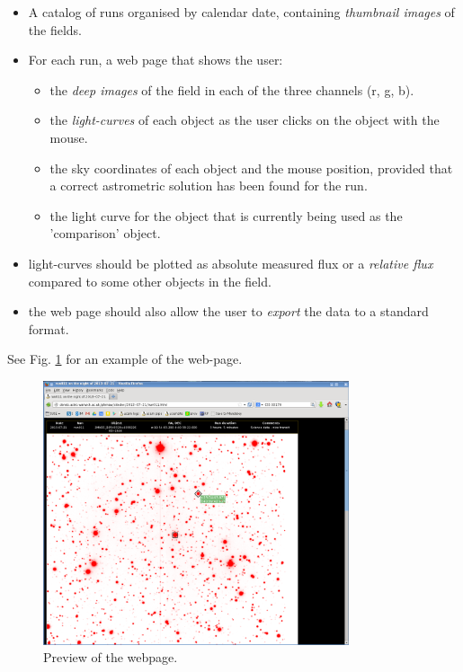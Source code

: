 \begin{itemize}
	\item A catalog of runs organised by calendar date, containing \emph{thumbnail images} of the fields.
	\item For each run, a web page that shows the user:
	\begin{itemize}
		\item the \emph{deep images} of the field in each of the three channels (r, g, b).
		\item the \emph{light-curves} of each object as the user clicks on the object with the mouse. 
		\item the sky coordinates of each object and the mouse position, provided that a correct astrometric solution has been found for the run. 
		\item the light curve for the object that is currently being used as the 'comparison' object. 
	\end{itemize}
	\item light-curves should be plotted as absolute measured flux or a \emph{relative flux} compared to some other objects in the field. 
	\item the web page should also allow the user to \emph{export} the data to a standard format.
	
\end{itemize}
See Fig. \ref{browser} for an example of the web-page. 

\begin{figure}[!h]
	\centering
	\includegraphics[width=90mm]{images/website1.png}
	\caption{Preview of the webpage.}
	\label{browser}
\end{figure}

